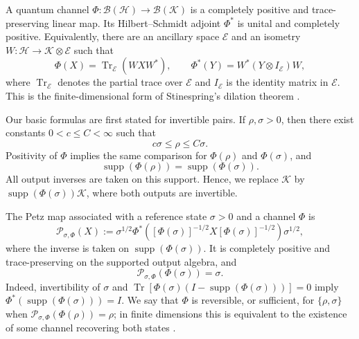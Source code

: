 \documentclass[11pt]{article}
\theoremstyle{remark}
\newcommand{\1}{\mathbbm{1}}
\begin{document}
A quantum channel
$\Phi:\mathcal B(\mathcal H)\to\mathcal B(\mathcal K)$ is a
completely positive and trace-preserving linear map.  Its Hilbert--Schmidt
adjoint $\Phi^*$ is unital and completely positive.  Equivalently,
there are an ancillary space $\mathcal E$ and an isometry
$W:\mathcal H\to\mathcal K\otimes\mathcal E$ such that
\begin{equation}
 \Phi(X)=\operatorname{Tr}_{\mathcal E}(WXW^*),
 \qquad
 \Phi^*(Y)=W^*(Y\otimes I_{\mathcal E})W ,
 \label{rw:eq:stinespring}
\end{equation}
where $\operatorname{Tr}_{\mathcal E}$ denotes the partial trace over ${\mathcal E}$ and $I_{\mathcal E}$ is the identity matrix in ${\mathcal E}$.
This is the finite-dimensional form of Stinespring's dilation theorem
\cite[Theorem~1]{stinespring1955positive}.


Our basic formulas are first stated for invertible pairs.  If
$\rho,\sigma>0$, then there exist constants $0<c\leq C<\infty$
such that
\begin{equation}
 c\sigma\leq\rho\leq C\sigma.
 \label{rw:eq:invertible-comparison}
\end{equation}
Positivity of $\Phi$ implies the same comparison for
$\Phi(\rho)$ and $\Phi(\sigma)$, and
\begin{equation}
 \operatorname{supp}(\Phi(\rho))=\operatorname{supp}(\Phi(\sigma)).
 \label{rw:eq:common-output-support}
\end{equation}
All output inverses are taken on this support.  Hence,
we replace $\mathcal K$ by
$\operatorname{supp}(\Phi(\sigma))\mathcal K$, where both outputs are invertible.  

The Petz map associated with a reference state $\sigma>0$ and a
channel $\Phi$ \cite{Petz-SufficiencyChannels-1978} is
\begin{equation}
 \mathcal P_{\sigma,\Phi}(X)
 :=\sigma^{1/2}\Phi^*\!\left(
[\Phi(\sigma)]^{-1/2}X[\Phi(\sigma)]^{-1/2}\right)\sigma^{1/2},
 \label{rw:eq:petz-map}
\end{equation}
where the inverse is taken on $\operatorname{supp}(\Phi(\sigma))$.  It is completely
positive and trace-preserving on the supported output algebra, and
\begin{equation}
 \mathcal P_{\sigma,\Phi}(\Phi(\sigma))=\sigma.
 \label{rw:eq:petz-recovers-reference}
\end{equation}
Indeed, invertibility of $\sigma$ and
$\operatorname{Tr}[\Phi(\sigma)(I-\operatorname{supp}(\Phi(\sigma)))]=0$ imply
$\Phi^*(\operatorname{supp}(\Phi(\sigma)))=I$.  We say that $\Phi$ is reversible, or
sufficient, for $\{\rho,\sigma\}$ when
$\mathcal P_{\sigma,\Phi}(\Phi(\rho))=\rho$; in finite dimensions
this is equivalent to the existence of some channel recovering both
states \cite{petz2003monotonicity,jenvcova2006sufficiency}.
\end{document}
